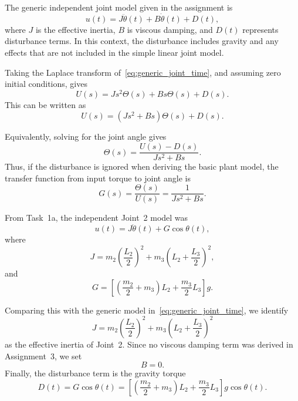 \documentclass{article}
\begin{document}
The generic independent joint model given in the assignment is
\begin{equation}
    u(t) = J\ddot{\theta}(t) + B\dot{\theta}(t) + D(t),
    \label{eq:generic_joint_time}
\end{equation}
where $J$ is the effective inertia, $B$ is viscous damping, and $D(t)$ represents disturbance terms. In this context, the disturbance includes gravity and any effects that are not included in the simple linear joint model.

Taking the Laplace transform of~\eqref{eq:generic_joint_time}, and assuming zero initial conditions, gives
\begin{equation}
    U(s) = Js^2\Theta(s) + Bs\Theta(s) + D(s).
\end{equation}
This can be written as
\begin{equation}
    U(s) = (Js^2 + Bs)\Theta(s) + D(s).
    \label{eq:generic_joint_laplace}
\end{equation}

Equivalently, solving for the joint angle gives
\begin{equation}
    \Theta(s)
    =
    \frac{U(s)-D(s)}{Js^2+Bs}.
    \label{eq:theta_laplace}
\end{equation}
Thus, if the disturbance is ignored when deriving the basic plant model, the transfer function from input torque to joint angle is
\begin{equation}
    G(s)
    =
    \frac{\Theta(s)}{U(s)}
    =
    \frac{1}{Js^2+Bs}.
    \label{eq:plant_transfer_function}
\end{equation}

From Task~1a, the independent Joint~2 model was
\begin{equation}
    u(t) = J\ddot{\theta}(t) + G\cos\theta(t),
\end{equation}
where
\begin{equation}
    J
    =
    m_2\left(\frac{L_2}{2}\right)^2
    +
    m_3\left(L_2+\frac{L_3}{2}\right)^2,
\end{equation}
and
\begin{equation}
    G
    =
    \left[
    \left(\frac{m_2}{2}+m_3\right)L_2
    +
    \frac{m_3}{2}L_3
    \right]g.
\end{equation}

Comparing this with the generic model in~\eqref{eq:generic_joint_time}, we identify
\begin{equation}
    \boxed{
    J
    =
    m_2\left(\frac{L_2}{2}\right)^2
    +
    m_3\left(L_2+\frac{L_3}{2}\right)^2
    }
\end{equation}
as the effective inertia of Joint~2. Since no viscous damping term was derived in Assignment~3, we set
\begin{equation}
    \boxed{B = 0}.
\end{equation}
Finally, the disturbance term is the gravity torque
\begin{equation}
    \boxed{
    D(t) = G\cos\theta(t)
    =
    \left[
    \left(\frac{m_2}{2}+m_3\right)L_2
    +
    \frac{m_3}{2}L_3
    \right]g\cos\theta(t)
    }.
\end{equation}
\end{document}
